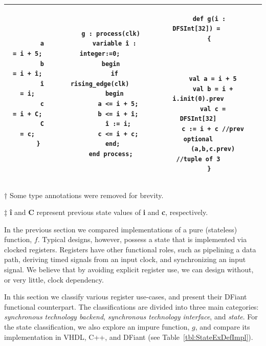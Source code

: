 \begin{table}
\begin{threeparttable}
\begin{tabular}{|c|c|c|c|c|}
\begin{minipage}[b]{0.14\linewidth}
\begin{verbatim}
        a = i + 5;
        b = i + î;
        î = i;
        c = i + C;
        C = c;
      }
		\end{verbatim}
	\end{minipage}
	&
	\begin{minipage}[b]{0.21\linewidth}
		\begin{verbatim}
      g : process(clk)
        variable î : integer:=0;
      begin
        if rising_edge(clk)
        begin
          a <= i + 5;
          b <= i + î;
          î := i;
          c <= i + c;
        end; 
      end process;
			\end{verbatim}
	\end{minipage}
	&
	\begin{minipage}[b]{0.23\linewidth}
		\begin{verbatim}
      def g(i : DFSInt[32]) = 
      {
        
        
        
        val a = i + 5
        val b = i + i.init(0).prev
        val c = DFSInt[32]
        c := i + c //prev optional
        (a,b,c.prev) //tuple of 3
      }
		\end{verbatim}
	\end{minipage}
  \\
  \hline
  \end{tabular}
  \begin{tablenotes}
    \item [†] Some type annotations were removed for brevity.
    \item [‡] \textbf{î} and \textbf{C} represent previous state values of \textbf{i} and \textbf{c}, respectively.
  \end{tablenotes}
  \end{threeparttable}
\end{table}%

In the previous section we compared implementations of a pure (stateless) function, $f$. Typical designs, however, possess a state that is implemented via clocked registers. Registers have other functional roles, such as pipelining a data path, deriving timed signals from an input clock, and synchronizing an input signal. We believe that by avoiding explicit register use, we can design without, or very little, clock dependency. 

In this section we classify various register use-cases, and present their DFiant functional counterpart. The classifications are divided into three main categories: \textit{synchronous technology backend}, \textit{synchronous technology interface}, and \textit{state}. For the state classification, we also explore an impure function, $g$, and compare its implementation in VHDL, C++, and DFiant (see Table~\ref{tbl:StateExDefImpl}).

